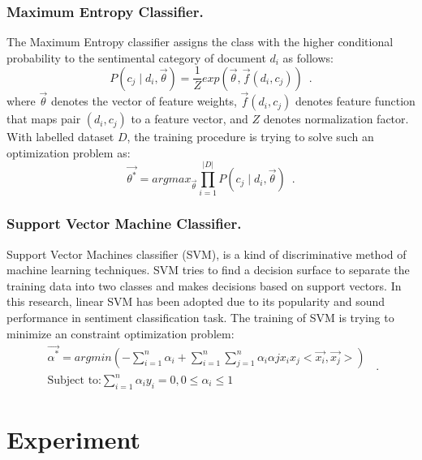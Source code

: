 \documentclass{llncs}
\begin{document}
\subsubsection{Maximum Entropy Classifier.}
\label{entropy}
The Maximum Entropy classifier assigns the class with the higher conditional probability to the sentimental category of document $ d_{i} $ as follows:
\begin{equation}
\label{e5}
P \left( c_{j} \mid d_{i}, \overrightarrow{\theta} \right) = \frac{1}{Z}exp \left( \overrightarrow{\theta}, \overrightarrow{f} \left( d_{i},c_{j} \right) \right) \enspace .
\end{equation}
where $ \overrightarrow{\theta} $ denotes the vector of feature weights, $ \overrightarrow{f} \left( d_{i}, c_{j} \right)$ denotes feature function that maps pair $ \left( d_{i}, c_{j} \right) $ to a feature vector, and $ Z $ denotes normalization factor.
With labelled dataset $ D $, the training procedure is trying to solve such an optimization problem as:
\begin{equation}
\label{e6}
\overrightarrow{\theta^{\ast}}=argmax_{\overrightarrow{\theta}}\prod_{i=1}^{|D|} P \left( c_{j} \mid d_{i}, \overrightarrow{\theta} \right) \enspace .
\end{equation} 
\subsubsection{Support Vector Machine Classifier.}
\label{svm}
Support Vector Machines classifier (SVM), is a kind of discriminative method of machine learning techniques.
SVM tries to find a decision surface to separate the training data into two classes and makes decisions based on support vectors. 
In this research, linear SVM has been adopted due to its popularity and sound performance in sentiment classification task.
The training of SVM is trying to minimize an constraint optimization problem:
\begin{equation}
\label{e7}
\begin{aligned}
\overrightarrow{\alpha^{\ast}}=argmin \left( -\sum_{i=1}^{n}\alpha_{i} + \sum_{i=1}^{n} \sum_{j=1}^{n}\alpha_{i}\alpha{j} x_{i}x_{j}<\overrightarrow{x_{i}},\overrightarrow{x_{j}}> \right)\\
\mbox{Subject to:} \sum_{i=1}^{n}\alpha_{i}y_{i}=0 , 0\leqslant \alpha_{i} \leqslant 1
\end{aligned} \enspace .
\end{equation}

\section{Experiment}
\label{experiment}
\end{document}
